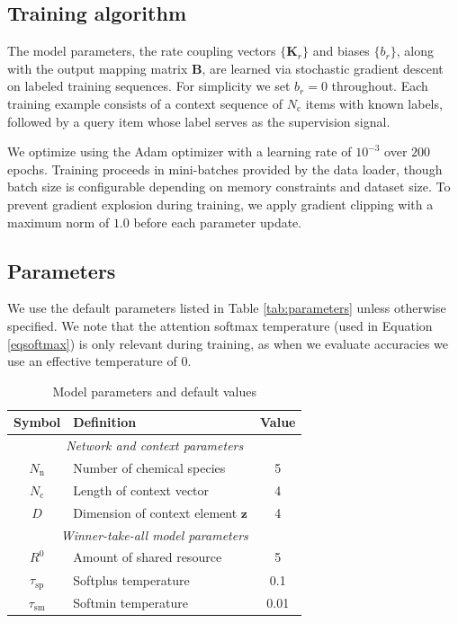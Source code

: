 \documentclass[%
reprint,
superscriptaddress,
amsmath,amssymb,
aps,
]{revtex4-2}
\begin{document}
\begin{onecolumngrid}
		\subsection{Training algorithm}\label{SIsec:Training}
		
		The model parameters, the rate coupling vectors $\{\mathbf{K}_r\}$ and biases $\{b_r\}$, along with the output mapping matrix $\mathbf{B}$, are learned via stochastic gradient descent on labeled training sequences.  For simplicity we set $b_r = 0$ throughout.  Each training example consists of a context sequence of $N_\text{c}$ items with known labels, followed by a query item whose label serves as the supervision signal.
		
		We optimize using the Adam optimizer with a learning rate of $10^{-3}$ over $200$ epochs. Training proceeds in mini-batches provided by the data loader, though batch size is configurable depending on memory constraints and dataset size. To prevent gradient explosion during training, we apply gradient clipping with a maximum norm of $1.0$ before each parameter update.
		
		
		\subsection{Parameters}\label{SIsec:params}
		We use the default parameters listed in Table \ref{tab:parameters} unless otherwise specified.  We note that the attention softmax temperature (used in Equation \ref{eqsoftmax}) is only relevant during training, as when we evaluate accuracies we use an effective temperature of 0.    
		
		\begin{table}[h]
			\centering
			\caption{Model parameters and default values}
			\begin{tabular}{|c|l|c|}
				\hline
				\textbf{Symbol} & \textbf{Definition} & \textbf{Value} \\
				\hline
				
				\multicolumn{3}{|c|}{\textit{Network and context parameters}} \\
				\hline
				$N_\text{n}$ & Number of chemical species & 5 \\
				$N_\text{c}$ & Length of context vector & 4 \\
				$D$ & Dimension of context element $\mathbf{z}$ & 4 \\
				\hline
				
				\multicolumn{3}{|c|}{\textit{Winner-take-all model parameters}} \\
				\hline
				$R^0$ & Amount of shared resource & 5 \\
				$\tau_\text{sp}$ & Softplus temperature & 0.1 \\
				$\tau_\text{sm}$ & Softmin temperature & 0.01 \\
				\hline
				

\end{tabular}
\end{table}
\end{onecolumngrid}
\end{document}
